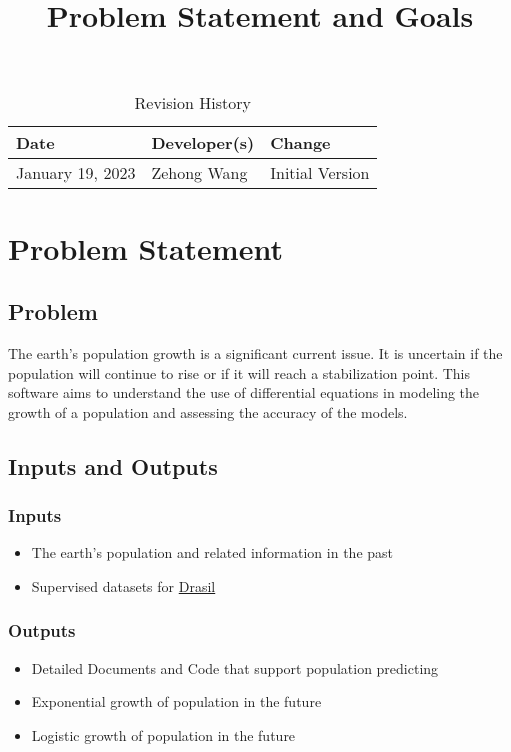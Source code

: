 \documentclass{article}
\title{Problem Statement and Goals\\\progname}
\author{\authname}
\date{}
\begin{document}
\maketitle

\begin{table}[hp]
\caption{Revision History} \label{TblRevisionHistory}
\begin{tabularx}{\textwidth}{llX}
\toprule
\textbf{Date} & \textbf{Developer(s)} & \textbf{Change}\\
\midrule
January 19, 2023 & Zehong Wang & Initial Version\\
\bottomrule
\end{tabularx}
\end{table}

\section{Problem Statement}
\subsection{Problem}
The earth's population growth is a significant current issue. It is uncertain
if the population will continue to rise or if it will reach a stabilization point.
This software aims to understand the use of differential equations in modeling
the growth of a population and assessing the accuracy of the models.
\subsection{Inputs and Outputs}
\subsubsection{Inputs}
\begin{itemize}
    \item The earth's population and related information in the past
    \item Supervised datasets for \href{https://jacquescarette.github.io/Drasil/}{Drasil}
\end{itemize}
\subsubsection{Outputs}
\begin{itemize}
    \item Detailed Documents and Code that support population predicting
    \item Exponential growth of population in the future
    \item Logistic growth of population in the future
\end{itemize}
\end{document}
